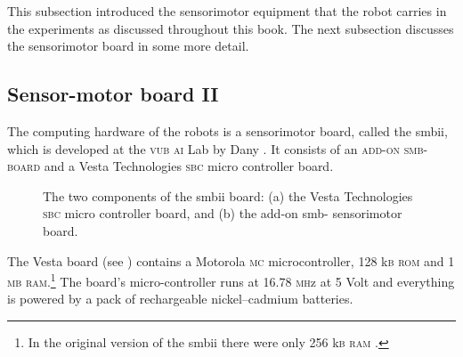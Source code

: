 \bigskip\noindent
This subsection introduced the sensorimotor equipment that the robot carries in the experiments as discussed throughout this book. The next subsection discusses the sensorimotor board in some more detail.

\subsection{Sensor-motor board II}\label{setup:smbii}


The computing hardware of the robots is a sensorimotor board, called the {\sc smbii}, which is developed at the {\scshape vub ai} Lab by Dany \citet{vereertbrugghen:1996}. It consists of an {\scshape add-on smb-{} board} and a Vesta Technologies {\scshape sbc} micro controller board.

\begin{figure}
\centering
{}
\caption{The two components of the {\sc smbii} board: (a) the Vesta Technologies {\scshape sbc} micro controller board, and (b) the add-on {\sc smb}-{} sensorimotor board.}
\end{figure}

The Vesta board (see ) contains a Motorola \textsc{mc} microcontroller, {128} {\footnotesize k}{\scshape b} {\scshape rom} and {1} {\scshape mb ram}.\footnote{In the original version of the {\sc smbii} there were only {256} {\scriptsize k}{\scshape b} {\scshape ram} \citep{vereertbrugghen:1996}.} The board's micro-controller runs at 16.78 {\scshape mh}{\footnotesize z} at 5 Volt and everything is powered by a pack of rechargeable nickel--cadmium batteries.

